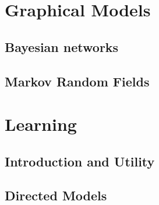 \documentclass[twoside,openright,titlepage,numbers=noenddot,openany,headinclude,footinclude=true,
  cleardoublepage=empty,abstractoff,BCOR=5mm,paper=a4,fontsize=12pt]{scrreprt}
\begin{document}
\part{Graphical Models}

\chapter{Bayesian networks}



\chapter{Markov Random Fields}




\ctparttext{
  \color{black}
  \begin{center}

  \end{center}
}
\part{Learning}

\chapter{Introduction and Utility}



\chapter{Directed Models}



\clearpage
\nocite{*}


\end{document}
